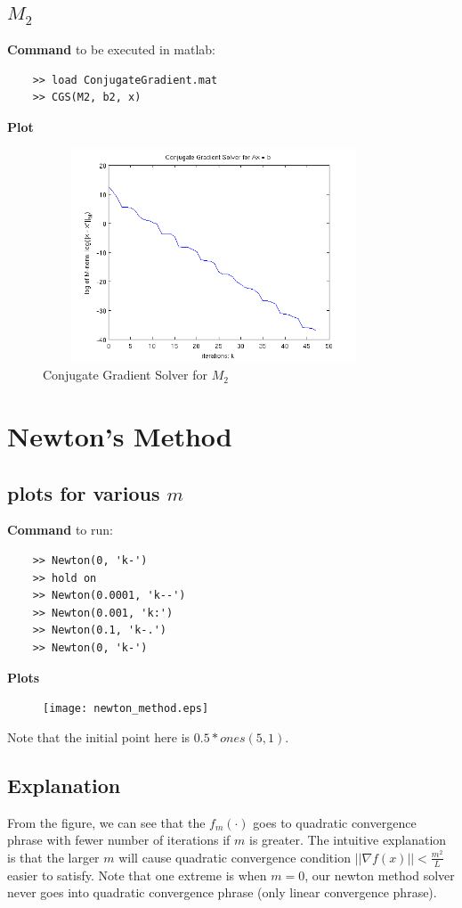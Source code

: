 \documentclass[11pt,a4paper]{article}
\begin{document}
\subsection{$M_2$}
{\bf Command} to be executed in matlab:
\begin{verbatim}
    >> load ConjugateGradient.mat
    >> CGS(M2, b2, x)
\end{verbatim}
{\bf Plot}
\begin{figure}[h]
    \centering
    \includegraphics[width=4in,height=2.5in]{../ps4_matlab/M2.png}
    \caption{Conjugate Gradient Solver for $M_2$}
\end{figure}

\newpage
\section{Newton’s Method}
\subsection{plots for various $m$}
{\bf Command} to run:
\begin{verbatim}
    >> Newton(0, 'k-')
    >> hold on
    >> Newton(0.0001, 'k--')
    >> Newton(0.001, 'k:')
    >> Newton(0.1, 'k-.')
    >> Newton(0, 'k-')
\end{verbatim}

\noindent
{\bf Plots}
\begin{figure}[h]
    \centering
    \texttt{[image: newton\_method.eps]}
\end{figure}
Note that the initial point here is $0.5 * ones(5, 1)$.

\subsection{Explanation}
From the figure, we can see that the $f_m(\cdot)$ goes to quadratic
convergence phrase with fewer number of iterations if $m$ is greater. The
intuitive explanation is that the larger $m$ will cause quadratic convergence
condition $|| \nabla f(x) || < \frac{m^2}{L}$ easier to satisfy. Note that one
extreme is when $m=0$, our newton method solver never goes into quadratic
convergence phrase (only linear convergence phrase).
\end{document}
